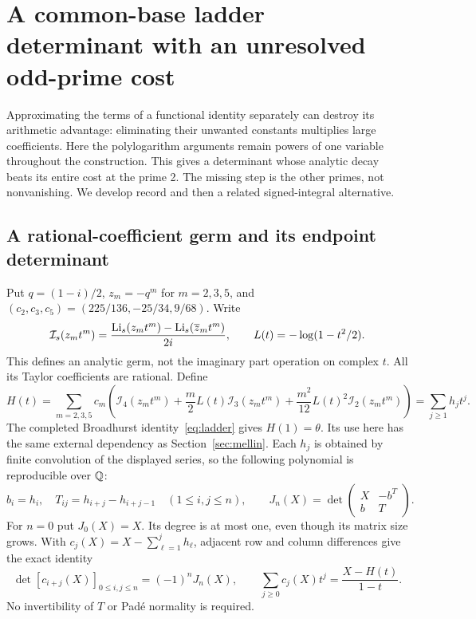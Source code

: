 \section{A common-base ladder determinant with an unresolved odd-prime cost}
\label{sec:common-base}

Approximating the terms of a functional identity separately can destroy
its arithmetic advantage: eliminating their unwanted constants multiplies
large coefficients. Here the polylogarithm arguments remain powers of
one variable throughout the construction. This gives a determinant whose
analytic decay beats its entire cost at the prime 2. The missing step is
the other primes, not nonvanishing. We develop record 
and then a related signed-integral alternative.

\subsection{A rational-coefficient germ and its endpoint determinant}
Put $q=(1-i)/2$, $z_m=-q^m$ for $m=2,3,5$, and
$(c_2,c_3,c_5)=(225/136,-25/34,9/68)$. Write
\[
 \mathcal I_s(z_mt^m)=
  \frac{\operatorname{Li}_s(z_mt^m)-\operatorname{Li}_s(\overline z_mt^m)}{2i},
 \qquad L(t)=-\log(1-t^2/2).
\]
This defines an analytic germ, not the imaginary part operation on
complex $t$. All its Taylor coefficients are rational. Define
\begin{equation}\label{eq:common-H}
 H(t)=\sum_{m=2,3,5}c_m\left(
 \mathcal I_4(z_mt^m)+\frac m2L(t)\mathcal I_3(z_mt^m)
              +\frac{m^2}{12}L(t)^2\mathcal I_2(z_mt^m)\right)
       =\sum_{j\geq1}h_jt^j.
\end{equation}
The completed Broadhurst identity~\eqref{eq:ladder} gives $H(1)=\theta$.
Its use here has the same external dependency as Section~\ref{sec:mellin}.
Each $h_j$ is obtained by finite convolution of the displayed series,
so the following polynomial is reproducible over $\mathbb Q$:
\begin{equation}\label{eq:common-J}
 b_i=h_i,\quad T_{ij}=h_{i+j}-h_{i+j-1}\quad(1\leq i,j\leq n),
 \qquad
 J_n(X)=\det\begin{pmatrix}X&-b^T\\b&T\end{pmatrix}.
\end{equation}
For $n=0$ put $J_0(X)=X$. Its degree is at most one, even though its
matrix size grows. With
$c_j(X)=X-\sum_{\ell=1}^jh_\ell$, adjacent row and column differences
give the exact identity
\begin{equation}\label{eq:common-hankel}
 \det[c_{i+j}(X)]_{0\leq i,j\leq n}=(-1)^nJ_n(X),
 \qquad \sum_{j\geq0}c_j(X)t^j=\frac{X-H(t)}{1-t}.
\end{equation}
No invertibility of $T$ or Pad\'e normality is required.

